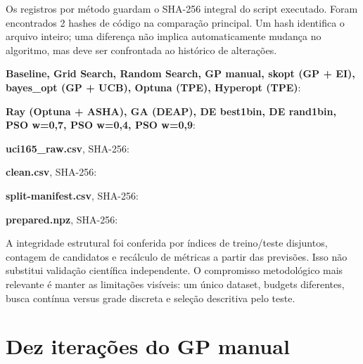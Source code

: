 \documentclass[12pt,a4paper]{article}
\begin{document}
Os registros por método guardam o SHA-256 integral do script executado. Foram encontrados 2 hashes de código na comparação principal. Um hash identifica o arquivo inteiro; uma diferença não implica automaticamente mudança no algoritmo, mas deve ser confrontada ao histórico de alterações.

\noindent\textbf{Baseline, Grid Search, Random Search, GP manual, skopt (GP + EI), bayes\_opt (GP + UCB), Optuna (TPE), Hyperopt (TPE)}:\\{\small\ttfamily{}}\par

\noindent\textbf{Ray (Optuna + ASHA), GA (DEAP), DE best1bin, DE rand1bin, PSO w=0,7, PSO w=0,4, PSO w=0,9}:\\{\small\ttfamily{}}\par

\noindent\textbf{uci165\_raw.csv}, SHA-256:\\{\small\ttfamily{}}\par

\noindent\textbf{clean.csv}, SHA-256:\\{\small\ttfamily{}}\par

\noindent\textbf{split-manifest.csv}, SHA-256:\\{\small\ttfamily{}}\par

\noindent\textbf{prepared.npz}, SHA-256:\\{\small\ttfamily{}}\par

A integridade estrutural foi conferida por índices de treino/teste disjuntos, contagem de candidatos e recálculo de métricas a partir das previsões. Isso não substitui validação científica independente. O compromisso metodológico mais relevante é manter as limitações visíveis: um único dataset, budgets diferentes, busca contínua versus grade discreta e seleção descritiva pelo teste.

\clearpage

\section{Dez iterações do GP manual}
\end{document}
